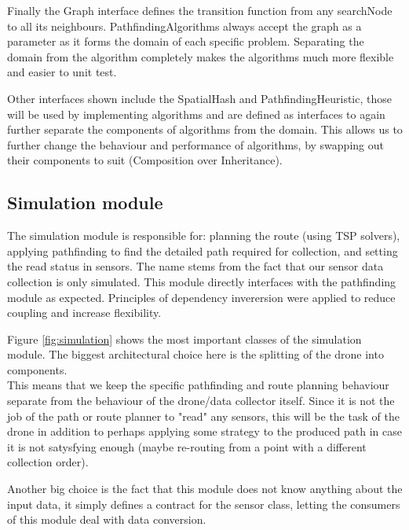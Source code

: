 \documentclass[10pt,a4paper]{article}
\begin{document}
\par 
Finally the Graph interface defines the transition function from any searchNode to all its neighbours. 
PathfindingAlgorithms always accept the graph as a parameter as it forms the domain of each specific problem. 
Separating the domain from the algorithm completely makes the algorithms much more flexible and easier to unit test.

\par 
Other interfaces shown include the SpatialHash and PathfindingHeuristic, those will be used by implementing algorithms and are defined as interfaces 
to again further separate the components of algorithms from the domain. This allows us to further change the behaviour and performance of algorithms,
by swapping out their components to suit (Composition over Inheritance). 





\subsection{Simulation module}
The simulation module is responsible for: planning the route (using TSP solvers), applying pathfinding to find the detailed path required for collection, and setting the read status in sensors. 
The name stems from the fact that our sensor data collection is only simulated. This module directly interfaces with the pathfinding module as expected. 
Principles of dependency inverersion were applied to reduce coupling and increase flexibility.
\par 
\medskip
Figure \ref{fig:simulation} shows the most important classes of the simulation module. The biggest architectural choice here is the splitting of the drone into components. 
\\
This means that we keep the specific pathfinding and route planning behaviour separate from the behaviour of the drone/data collector itself.
Since it is not the job of the path or route planner to "read" any sensors, this will be the task of the drone in addition to perhaps applying some strategy
to the produced path in case it is not satysfying enough (maybe re-routing from a point with a different collection order).
\par
Another big choice is the fact that this module does not know anything about the input data, it simply defines a contract for the sensor class, letting the consumers of this module deal with 
data conversion.
\end{document}
